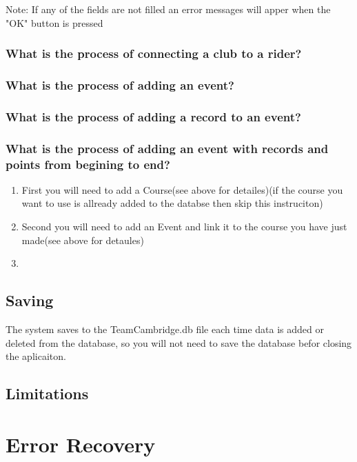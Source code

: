 Note: If  any of the fields are not filled an error messages will apper when the "OK" button is pressed

\subsubsection{What is the process of connecting a club to a rider?}

\subsubsection{What is the process of adding an event?}

\subsubsection{What is the process of adding a record to an event?}

\subsubsection{What is the process of adding an event with records and points from begining to end?}
\begin{enumerate}
\item First you will need to add a Course(see above for detailes)(if the course you want to use is allready added to the databse then skip this instruciton)
\item Second you will need to add an Event and link it to the course you have just made(see above for detaules)
\item 
\end{enumerate}

\subsection{Saving}
The system saves to the TeamCambridge.db file each time data is added or deleted from the database, so you will not need to save the database befor closing the aplicaiton.
\subsection{Limitations}

\section{Error Recovery}

